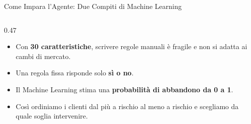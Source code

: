 \documentclass[aspectratio=169, 10pt]{beamer}
\begin{document}
\begin{frame}{Come Impara l'Agente: Due Compiti di Machine Learning}
\begin{columns}[T, onlytextwidth]
\begin{column}{0.47\textwidth}
            \begin{itemize}
                \setlength{\itemsep}{5pt}
                \small
                \item Con \textbf{30 caratteristiche}, scrivere regole manuali è fragile e non si adatta ai cambi di mercato.
                \item Una regola fissa risponde solo \textbf{sì o no}.
                \item Il Machine Learning stima una \textbf{probabilità di abbandono da 0 a 1}.
                \item Così ordiniamo i clienti dal più a rischio al meno a rischio e scegliamo da quale soglia intervenire.
            \end{itemize}
        \end{column}
    \end{columns}
\end{frame}
\end{document}

